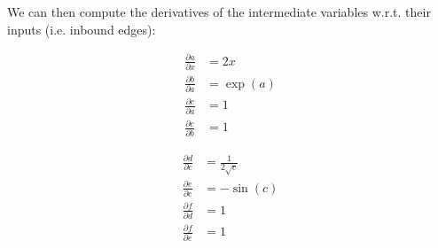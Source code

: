 \begin{example}
    We can then compute the derivatives of the intermediate variables w.r.t. their inputs (i.e. inbound edges):\\
    \begin{minipage}{.5\linewidth}
        \[
            \begin{split}
                \frac{\partial a}{\partial x} &= 2x                     \\
                \frac{\partial b}{\partial a} &= \exp(a)                \\
                \frac{\partial c}{\partial a} &= 1                      \\
                \frac{\partial c}{\partial b} &= 1
            \end{split}
        \]
    \end{minipage}%
    \begin{minipage}{.5\linewidth}
        \[
            \begin{split}
                \frac{\partial d}{\partial c} &= \frac{1}{2\sqrt{c}}    \\
                \frac{\partial e}{\partial c} &= -\sin(c)               \\
                \frac{\partial f}{\partial d} &= 1                      \\
                \frac{\partial f}{\partial e} &= 1                      
            \end{split}
        \]
    \end{minipage}\\


\end{example}
